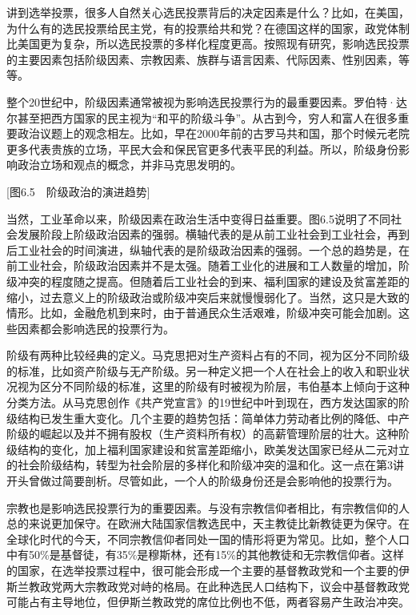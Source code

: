 讲到选举投票，很多人自然关心选民投票背后的决定因素是什么？比如，在美国，为什么有的选民投票给民主党，有的投票给共和党？在德国这样的国家，政党体制比美国更为复杂，所以选民投票的多样化程度更高。按照现有研究，影响选民投票的主要因素包括阶级因素、宗教因素、族群与语言因素、代际因素、性别因素，等等。

整个20世纪中，阶级因素通常被视为影响选民投票行为的最重要因素。罗伯特·达尔甚至把西方国家的民主视为“和平的阶级斗争”。从古到今，穷人和富人在很多重要政治议题上的观念相左。比如，早在2000年前的古罗马共和国，那个时候元老院更多代表贵族的立场，平民大会和保民官更多代表平民的利益。所以，阶级身份影响政治立场和观点的概念，并非马克思发明的。

[图6.5　阶级政治的演进趋势]

当然，工业革命以来，阶级因素在政治生活中变得日益重要。图6.5说明了不同社会发展阶段上阶级政治因素的强弱。横轴代表的是从前工业社会到工业社会，再到后工业社会的时间演进，纵轴代表的是阶级政治因素的强弱。一个总的趋势是，在前工业社会，阶级政治因素并不是太强。随着工业化的进展和工人数量的增加，阶级冲突的程度随之提高。但随着后工业社会的到来、福利国家的建设及贫富差距的缩小，过去意义上的阶级政治或阶级冲突后来就慢慢弱化了。当然，这只是大致的情形。比如，金融危机到来时，由于普通民众生活艰难，阶级冲突可能会加剧。这些因素都会影响选民的投票行为。

阶级有两种比较经典的定义。马克思把对生产资料占有的不同，视为区分不同阶级的标准，比如资产阶级与无产阶级。另一种定义把一个人在社会上的收入和职业状况视为区分不同阶级的标准，这里的阶级有时被视为阶层，韦伯基本上倾向于这种分类方法。从马克思创作《共产党宣言》的19世纪中叶到现在，西方发达国家的阶级结构已发生重大变化。几个主要的趋势包括：简单体力劳动者比例的降低、中产阶级的崛起以及并不拥有股权（生产资料所有权）的高薪管理阶层的壮大。这种阶级结构的变化，加上福利国家建设和贫富差距缩小，欧美发达国家已经从二元对立的社会阶级结构，转型为社会阶层的多样化和阶级冲突的温和化。这一点在第3讲开头曾做过简要剖析。尽管如此，一个人的阶级身份还是会影响他的投票行为。

宗教也是影响选民投票行为的重要因素。与没有宗教信仰者相比，有宗教信仰的人总的来说更加保守。在欧洲大陆国家信教选民中，天主教徒比新教徒更为保守。在全球化时代的今天，不同宗教信仰者同处一国的情形将更为常见。比如，整个人口中有50\%是基督徒，有35\%是穆斯林，还有15\%的其他教徒和无宗教信仰者。这样的国家，在选举投票过程中，很可能会形成一个主要的基督教政党和一个主要的伊斯兰教政党两大宗教政党对峙的格局。在此种选民人口结构下，议会中基督教政党可能占有主导地位，但伊斯兰教政党的席位比例也不低，两者容易产生政治冲突。

